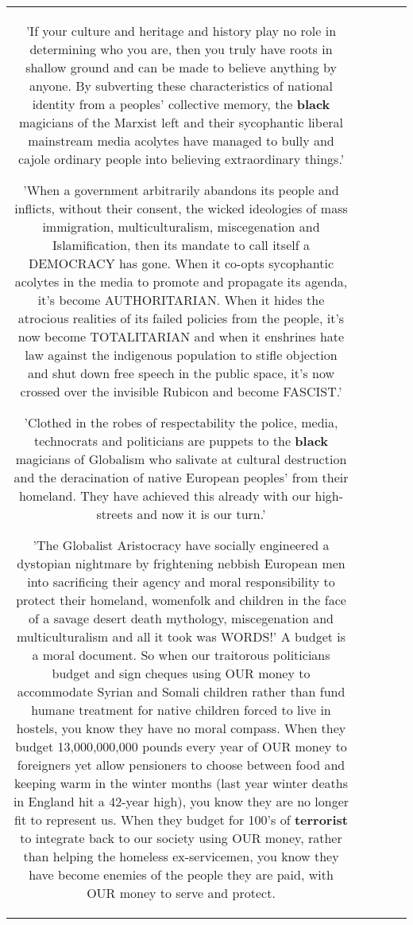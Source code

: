 \documentclass[11pt]{article}
\newlength\mylength
\begin{document}
\begin{center}
\begin{longtable}{|C{.65\mylength}|C{.30\mylength}|C{.12\mylength}|C{.12\mylength}|C{.12\mylength}|}
  \small 'If your culture and heritage and history play no role in determining who you are, then you truly have roots in shallow ground and can be made to believe anything by anyone. By subverting these characteristics of national identity from a peoples' collective memory, the \textbf{black} magicians of the Marxist left and their sycophantic liberal mainstream media acolytes have managed to bully and cajole ordinary people into believing extraordinary things.' 

'When a government arbitrarily abandons its people and inflicts, without their consent, the wicked ideologies of mass immigration, multiculturalism, miscegenation and Islamification, then its mandate to call itself a DEMOCRACY has gone. When it co-opts sycophantic acolytes in the media to promote and propagate its agenda, it's become AUTHORITARIAN. When it hides the atrocious realities of its failed policies from the people, it's now become TOTALITARIAN and when it enshrines hate law against the indigenous population to stifle objection and shut down free speech in the public space, it's now crossed over the invisible Rubicon and become FASCIST.'

'Clothed in the robes of respectability the police, media, technocrats and politicians are puppets to the \textbf{black} magicians of Globalism who salivate at cultural destruction and the deracination of native European peoples' from their homeland. They have achieved this already with our high-streets and now it is our turn.'

'The Globalist Aristocracy have socially engineered a dystopian nightmare by frightening nebbish European men into sacrificing their agency and moral responsibility to protect their homeland, womenfolk and children in the face of a savage desert death mythology, miscegenation and multiculturalism and all it took was WORDS!'
A budget is a moral document. So when our traitorous politicians budget and sign cheques using OUR money to accommodate Syrian and Somali children rather than fund humane treatment for native children forced to live in hostels, you know they have no moral compass. When they budget 13,000,000,000 pounds every year of OUR money to foreigners yet allow pensioners to choose between food and keeping warm in the winter months (last year winter deaths in England hit a 42-year high), you know they are no longer fit to represent us. When they budget for 100's of \textbf{terrorist} to integrate back to our society using OUR money, rather than helping the homeless ex-servicemen, you know they have become enemies of the people they are paid, with OUR money to serve and protect.


\end{longtable}
\end{center}
\end{document}
